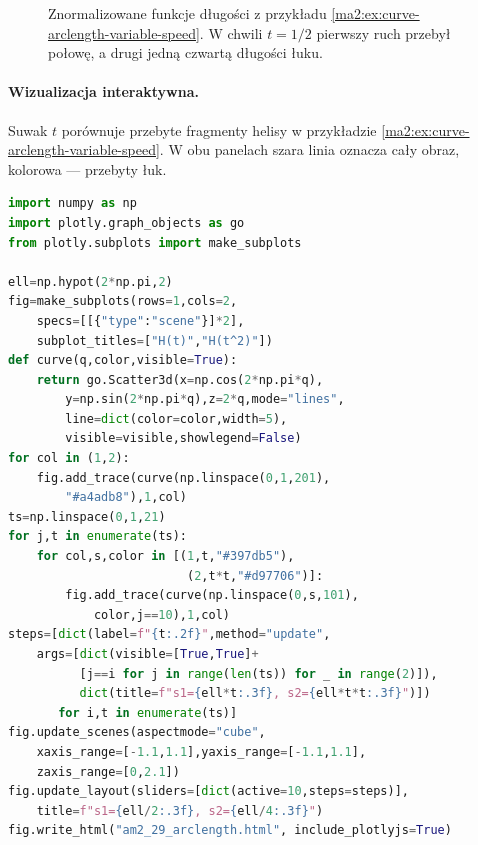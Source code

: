\begin{figure}[htbp]
\centering
{}
\caption{Znormalizowane funkcje długości
z przykładu \ref{ma2:ex:curve-arclength-variable-speed}.
W chwili $t=1/2$ pierwszy ruch przebył
połowę, a drugi jedną czwartą długości łuku.}
\label{ma2:fig:curve-arclength-variable-speed}
\end{figure}


\paragraph{Wizualizacja interaktywna.}
Suwak $t$ porównuje przebyte fragmenty
helisy w przykładzie
\ref{ma2:ex:curve-arclength-variable-speed}.
W obu panelach szara linia oznacza cały
obraz, kolorowa --- przebyty łuk.
\begin{lstlisting}[language=Python]
import numpy as np
import plotly.graph_objects as go
from plotly.subplots import make_subplots

ell=np.hypot(2*np.pi,2)
fig=make_subplots(rows=1,cols=2,
    specs=[[{"type":"scene"}]*2],
    subplot_titles=["H(t)","H(t^2)"])
def curve(q,color,visible=True):
    return go.Scatter3d(x=np.cos(2*np.pi*q),
        y=np.sin(2*np.pi*q),z=2*q,mode="lines",
        line=dict(color=color,width=5),
        visible=visible,showlegend=False)
for col in (1,2):
    fig.add_trace(curve(np.linspace(0,1,201),
        "#a4adb8"),1,col)
ts=np.linspace(0,1,21)
for j,t in enumerate(ts):
    for col,s,color in [(1,t,"#397db5"),
                         (2,t*t,"#d97706")]:
        fig.add_trace(curve(np.linspace(0,s,101),
            color,j==10),1,col)
steps=[dict(label=f"{t:.2f}",method="update",
    args=[dict(visible=[True,True]+
          [j==i for j in range(len(ts)) for _ in range(2)]),
          dict(title=f"s1={ell*t:.3f}, s2={ell*t*t:.3f}")])
       for i,t in enumerate(ts)]
fig.update_scenes(aspectmode="cube",
    xaxis_range=[-1.1,1.1],yaxis_range=[-1.1,1.1],
    zaxis_range=[0,2.1])
fig.update_layout(sliders=[dict(active=10,steps=steps)],
    title=f"s1={ell/2:.3f}, s2={ell/4:.3f}")
fig.write_html("am2_29_arclength.html", include_plotlyjs=True)
\end{lstlisting}

